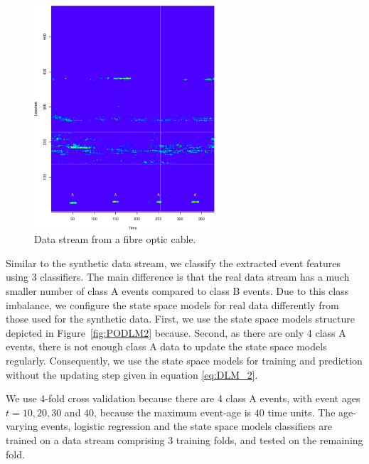 \documentclass[a4paper,11pt]{article}
\begin{document}
\begin{figure}[!b]
	\centering
	\includegraphics[width=0.6\textwidth]{./Graphics/Real_World_stream.pdf}
	\caption{Data stream from a fibre optic cable.}
	\label{fig:Real_World_Data_Stream}
\end{figure}

Similar to the synthetic data stream, we classify the extracted event features using 3 classifiers. The main difference is that the real data stream has a much smaller number of class A events compared to class B events. Due to this class imbalance, we configure the state space models for real data differently from those used for the synthetic data. First, we use the state space models structure depicted in Figure~\ref{fig:PODLM2} because. Second, as there are only $4$ class A events, there is not enough class A data to update the state space models regularly. Consequently, we use the state space models for training and prediction without the updating step given in equation \eqref{eq:DLM_2}.

We use $4$-fold cross validation because there are 4 class A events, with event ages $t = 10, 20, 30$ and $40$, because the maximum event-age is $40$ time units. The age-varying events, logistic regression and the state space models classifiers are trained on a data stream comprising 3 training folds, and tested on the remaining fold.
\end{document}
